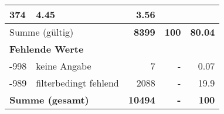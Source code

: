 \begin{longtable}{lXrrr}
       \num{374} &
       \num[round-mode=places,round-precision=2]{4.45} &
         \num[round-mode=places,round-precision=2]{3.56} \\
     \midrule
     \multicolumn{2}{l}{Summe (gültig)} &
       \textbf{\num{8399}} &
     \textbf{\num{100}} &
       \textbf{\num[round-mode=places,round-precision=2]{80.04}} \\
     \multicolumn{5}{l}{\textbf{Fehlende Werte}}\\
       -998 &
       keine Angabe &
         \num{7} &
        - &
         \num[round-mode=places,round-precision=2]{0.07} \\
       -989 &
       filterbedingt fehlend &
         \num{2088} &
        - &
         \num[round-mode=places,round-precision=2]{19.9} \\
     \midrule
     \multicolumn{2}{l}{\textbf{Summe (gesamt)}} &
          \textbf{\num{10494}} &
        \textbf{-} &
        \textbf{\num{100}} \\
     \bottomrule
     \end{longtable}
     

